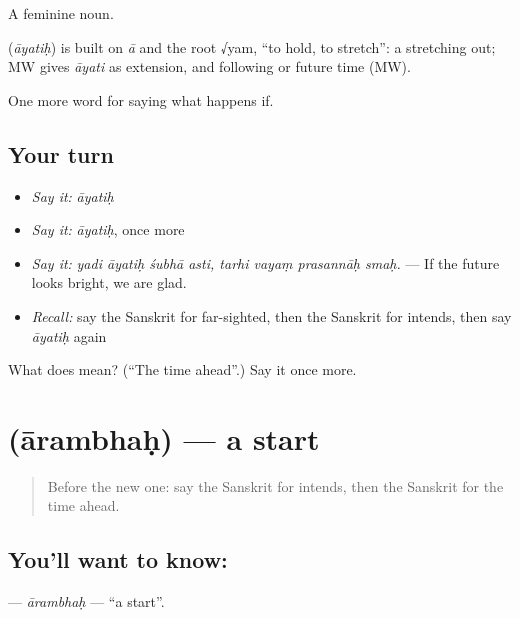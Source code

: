 A feminine noun.

\begin{cousinweb}
\textbf{} (\emph{āyatiḥ}) is built on \emph{ā} and the root √yam, \textquotedblleft{}to hold, to stretch\textquotedblright{}: a stretching out; MW gives \emph{āyati} as extension, and following or future time (MW).
\end{cousinweb}

\begin{grammarlens}[title={What you've built}]
One more word for saying what happens if.
\end{grammarlens}

\subsection*{Your turn}
\begin{itemize}
\raggedright
  \item \emph{Say it:} \emph{āyatiḥ}
  \item \emph{Say it:} \emph{āyatiḥ}, once more
  \item \emph{Say it:} \emph{yadi āyatiḥ śubhā asti, tarhi vayaṃ prasannāḥ smaḥ.} — If the future looks bright, we are glad.
  \item \emph{Recall:} say the Sanskrit for far-sighted, then the Sanskrit for intends, then say \emph{āyatiḥ} again
\end{itemize}

\begin{tcolorbox}[breakable,colback=teal!4,colframe=teal!35!black,title={Before you move on}]
What does  mean? (\textquotedblleft{}The time ahead\textquotedblright{}.) Say it once more.
\end{tcolorbox}
\section[\texorpdfstring{\sk{आरम्भः} (ārambhaḥ)}{आरम्भः (ārambhaḥ)}]{ (ārambhaḥ) — a start}

\label{lesson:SA-C554-arambhah}



\begin{quote}
Before the new one: say the Sanskrit for intends, then the Sanskrit for the time ahead.
\end{quote}

\subsection*{You'll want to know: }
\textbf{} — \emph{ārambhaḥ} — \textquotedblleft{}a start\textquotedblright{}.

